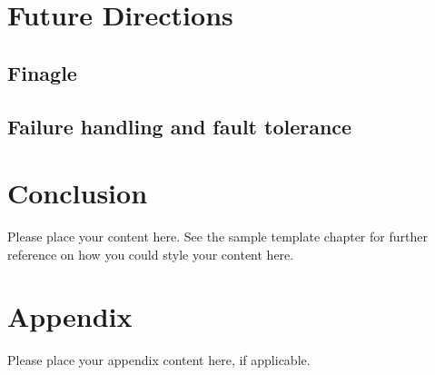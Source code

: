 \documentclass[
graybox,
envcountchap
]{svmult}
\begin{document}
\begin{bibunit}




  \section{Future Directions}
  \subsection{Finagle}
  \subsection{Failure handling and fault tolerance}

  \section{Conclusion}

	Please place your content here. See the sample template chapter for further reference on how you could style your content here.


	\section*{Appendix}\label{appendix}

	Please place your appendix content here, if applicable.




	\putbib[bibliography] %

\end{bibunit}

\end{document}
